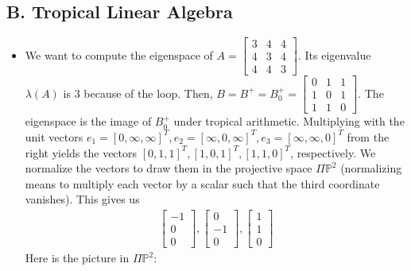 \documentclass{article}
\begin{document}
\subsection*{B. Tropical Linear Algebra}

\begin{itemize}
	\item We want to compute the eigenspace of 
	\( 
		A = 
		\begin{bmatrix}
			3 & 4 & 4 \\ 4 & 3 & 4 \\ 4 & 4 & 3 
		\end{bmatrix}
	\).
	Its eigenvalue \( \lambda(A) \) is \( 3 \) because of the loop. Then, 
	\( 
		B = B^+ = B^+_0 =
		\begin{bmatrix}
			0 & 1 & 1 \\ 1 & 0 & 1 \\ 1 & 1 & 0
		\end{bmatrix}.
	\)
		The eigenspace is the image of \( B_0^+ \) under tropical arithmetic. Multiplying with the unit vectors \( e_1 = [0, \infty, \infty]^T, e_2 = [\infty, 0, \infty]^T, e_3 = [\infty, \infty, 0]^T \) from the right yields the vectors \( [0,1,1]^T, [1,0,1]^T, [1,1,0]^T \), respectively. We normalize the vectors to draw them in the projective space \( \Pi \mathbb{P}^2 \) (normalizing means to multiply each vector by a scalar such that the third coordinate vanishes). This gives us 
		\begin{align*}
			\begin{bmatrix}
				-1 \\ 0 \\ 0
			\end{bmatrix},
			\begin{bmatrix}
				0 \\ -1 \\ 0
			\end{bmatrix},
			\begin{bmatrix}
				1 \\ 1 \\ 0
			\end{bmatrix}
		\end{align*}
		Here is the picture in \( \Pi \mathbb{P}^2 \):
		\begin{figure}[H]
			\centering
\end{figure}
\end{itemize}
\end{document}

